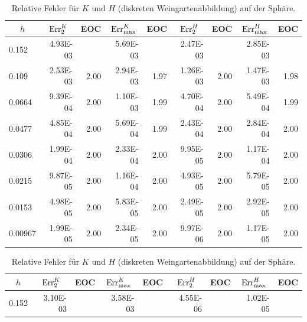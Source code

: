    \begin{table}[htbp]
      \centering
      \begin{tabular}{|l|r|r|r|r|r|r|r|r|}
      \hline
      \multicolumn{1}{|c|}{\( h \)} & \multicolumn{1}{c|}{\( \text{Err}_{2}^{K} \)} & \multicolumn{1}{c|}{EOC} & 
           \multicolumn{1}{c|}{\( \text{Err}_{\max}^{K} \)} & \multicolumn{1}{c|}{EOC} & \multicolumn{1}{c|}{\( \text{Err}_{2}^{H} \)} &
           \multicolumn{1}{c|}{EOC} & \multicolumn{1}{c|}{\( \text{Err}_{\max}^{H} \)} & \multicolumn{1}{c|}{EOC} \\ \hline
      0.152 & 4.93E-03 & \multicolumn{1}{l|}{} & 5.69E-03 & \multicolumn{1}{l|}{} & 2.47E-03 & \multicolumn{1}{l|}{} & 2.85E-03 & \multicolumn{1}{l|}{} \\ \hline
      0.109 & 2.53E-03 & 2.00 & 2.94E-03 & 1.97 & 1.26E-03 & 2.00 & 1.47E-03 & 1.98 \\ \hline
      0.0664 & 9.39E-04 & 2.00 & 1.10E-03 & 1.99 & 4.70E-04 & 2.00 & 5.49E-04 & 1.99 \\ \hline
      0.0477 & 4.85E-04 & 2.00 & 5.69E-04 & 1.99 & 2.43E-04 & 2.00 & 2.84E-04 & 2.00 \\ \hline
      0.0306 & 1.99E-04 & 2.00 & 2.33E-04 & 2.00 & 9.95E-05 & 2.00 & 1.17E-04 & 2.00 \\ \hline
      0.0215 & 9.87E-05 & 2.00 & 1.16E-04 & 2.00 & 4.93E-05 & 2.00 & 5.79E-05 & 2.00 \\ \hline
      0.0153 & 4.98E-05 & 2.00 & 5.83E-05 & 2.00 & 2.49E-05 & 2.00 & 2.92E-05 & 2.00 \\ \hline
      0.00967 & 1.99E-05 & 2.00 & 2.34E-05 & 2.00 & 9.97E-06 & 2.00 & 1.17E-05 & 2.00 \\ \hline
      \end{tabular}
      \caption[Weingarten auf der Sphäre]{Relative Fehler für \( K \) und \( H \) (diskreten Weingartenabbildung) auf der Sphäre.}
      \label{tabSphereWeingarten}
      \vspace{10pt}
      \begin{tabular}{|l|r|r|r|r|r|r|r|r|}
      \hline
      \multicolumn{1}{|c|}{\( h \)} & \multicolumn{1}{c|}{\( \text{Err}_{2}^{K} \)} & \multicolumn{1}{c|}{EOC} & 
           \multicolumn{1}{c|}{\( \text{Err}_{\max}^{K} \)} & \multicolumn{1}{c|}{EOC} & \multicolumn{1}{c|}{\( \text{Err}_{2}^{H} \)} &
           \multicolumn{1}{c|}{EOC} & \multicolumn{1}{c|}{\( \text{Err}_{\max}^{H} \)} & \multicolumn{1}{c|}{EOC} \\ \hline
           0.152 & 3.10E-03 & \multicolumn{1}{l|}{} & 3.58E-03 & \multicolumn{1}{l|}{} & 4.55E-06 & \multicolumn{1}{l|}{} & 1.02E-05 & \multicolumn{1}{l|}{} \\ \hline

\end{tabular}
\end{table}
